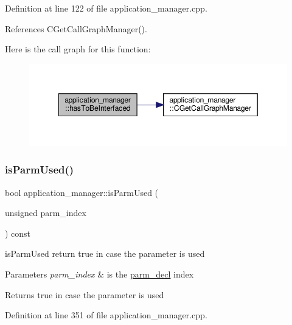 Definition at line 122 of file application\+\_\+manager.\+cpp.



References C\+Get\+Call\+Graph\+Manager().

Here is the call graph for this function\+:
\nopagebreak
\begin{figure}[H]
\begin{center}
\leavevmode
\includegraphics[width=349pt]{dc/db5/classapplication__manager_a7dd91f4c02d88ca6064d113520e6632c_cgraph}
\end{center}
\end{figure}
\mbox{\label{classapplication__manager_a98f01e0832d7103f7c51d7d689bc8daf}} 
\subsubsection{\texorpdfstring{is\+Parm\+Used()}{isParmUsed()}}
{\footnotesize\ttfamily bool application\+\_\+manager\+::is\+Parm\+Used (\begin{DoxyParamCaption}\item[{unsigned}]{parm\+\_\+index }\end{DoxyParamCaption}) const}



is\+Parm\+Used return true in case the parameter is used 


\begin{DoxyParams}{Parameters}
{\em parm\+\_\+index} & is the \hyperlink{structparm__decl}{parm\+\_\+decl} index \\
\hline
\end{DoxyParams}
\begin{DoxyReturn}{Returns}
true in case the parameter is used 
\end{DoxyReturn}


Definition at line 351 of file application\+\_\+manager.\+cpp.




